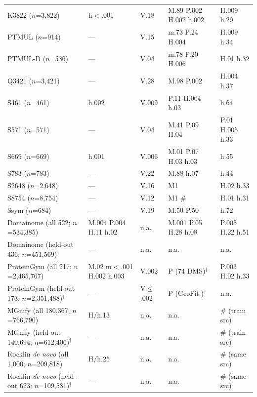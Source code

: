 \begin{table}[H]
{\begin{tabular}{@{}lllll}
        K3822 ($n$=3,822) & h$<$.001 & V.18 & M.89 P.002 H.002 h.002 & H.009 h.29 \\
        PTMUL ($n$=914) & --- & V.15 & m.73 P.24 H.004 & H.009 h.34 \\
        PTMUL-D ($n$=536) & --- & V.04 & m.78 P.20 H.006 & H.01 h.32 \\
        Q3421 ($n$=3,421) & --- & V.28 & M.98 P.002 & H.004 h.37 \\
        S461 ($n$=461) & h.002 & V.009 & P.11 H.004 h.03 & h.64 \\
        S571 ($n$=571) & --- & V.04 & M.41 P.09 H.04 & P.01 H.005 h.33 \\
        S669 ($n$=669) & h.001 & V.006 & M.01 P.07 H.03 h.03 & h.55 \\
        S783 ($n$=783) & --- & V.22 & M.88 h.07 & h.44 \\
        S2648 ($n$=2,648) & --- & V.16 & M1 & H.02 h.33 \\
        S8754 ($n$=8,754) & --- & V.12 & M1 \# & H.01 h.31 \\
        Ssym ($n$=684) & --- & V.19 & M.50 P.50 & h.72 \\
        \midrule
        Domainome (all 522; $n$=534,385) & M.004 P.004 H.11 h.02 & n.a. & M.001 P.05 H.28 h.08 & P.005 H.22 h.51 \\
        Domainome (held-out 436; $n$=451,569)$^\dagger$ & --- & n.a. & n.a. & n.a. \\
        ProteinGym (all 217; $n$=2,465,767) & M.02 m$<$.001 H.002 h.003 & V.002 & P (74 DMS)$^\ddagger$ & P.003 H.02 h.33 \\
        ProteinGym (held-out 173; $n$=2,351,488)$^\dagger$ & --- & V$\le$.002 & P (GeoFit.)$^\ddagger$ & n.a. \\
        MGnify (all 180,367; $n$=766,790) & H/h.13 & n.a. & n.a. & \# (train src) \\
        MGnify (held-out 140,694; $n$=612,406)$^\dagger$ & --- & n.a. & n.a. & \# (train src) \\
        Rocklin \textit{de novo} (all 1,000; $n$=209,818) & H/h.25 & n.a. & n.a. & \# (same src) \\
        Rocklin \textit{de novo} (held-out 623; $n$=109,581)$^\dagger$ & --- & n.a. & n.a. & \# (same src) \\
    \bottomrule
    \end{tabular}
    }
    \par\bigskip
\end{table}

